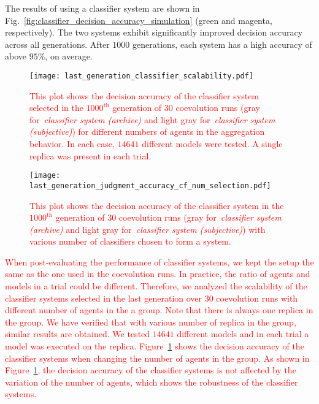 The results of using a classifier system are shown in Fig.~\ref{fig:classifier_decision_accuracy_simulation} (green and magenta, respectively). The two systems exhibit significantly improved decision accuracy across all generations. After $1000$ generations, each system has a high accuracy of above $95\%$, on average. 
\begin{figure}[!t]
    \centering
    \texttt{[image: last\_generation\_classifier\_scalability.pdf]}
    \caption{\textcolor{red}{This plot shows the decision accuracy of the classifier system selected in the $1000^\mathrm{th}$ generation of $30$ coevolution runs (gray for~\textit{classifier system (archive)} and light gray for~\textit{classifier system (subjective)}) for different numbers of agents in the aggregation behavior. In each case, $14641$ different models were tested. A single replica was present in each trial.}}
    \label{fig:classifier_scalability_aggregation}
\end{figure}
%
\begin{figure}[!t]%
	\centering
	\texttt{[image: last\_generation\_judgment\_accuracy\_cf\_num\_selection.pdf]}
	\caption{\textcolor{red}{This plot shows the decision accuracy of the classifier system in the $1000^\mathrm{th}$ generation of $30$ coevolution runs (gray for~\textit{classifier system (archive)} and light gray for~\textit{classifier system (subjective)}) with various number of classifiers chosen to form a system.}}
	\label{fig:last_generation_judgment_accuracy_cf_num_selection}
\end{figure}
%
\textcolor{red}{When post-evaluating the performance of classifier systems, we kept the setup the same as the one used in the coevolution runs. In practice, the ratio of agents and models in a trial could be different. Therefore, we analyzed the scalability of the classifier systems selected in the last generation over $30$ coevolution runs with different number of agents in the a group. Note that there is always one replica in the group. We have verified that with various number of replica in the group, similar results are obtained. We tested $14641$ different models and in each trial a model was executed on the replica. Figure~\ref{fig:classifier_scalability_aggregation} shows the decision accuracy of the classifier systems when changing the number of agents in the group. As shown in Figure~\ref{fig:classifier_scalability_aggregation}, the decision accuracy of the classifier systems is not affected by the variation of the number of agents, which shows the robustness of the classifier systems.}

